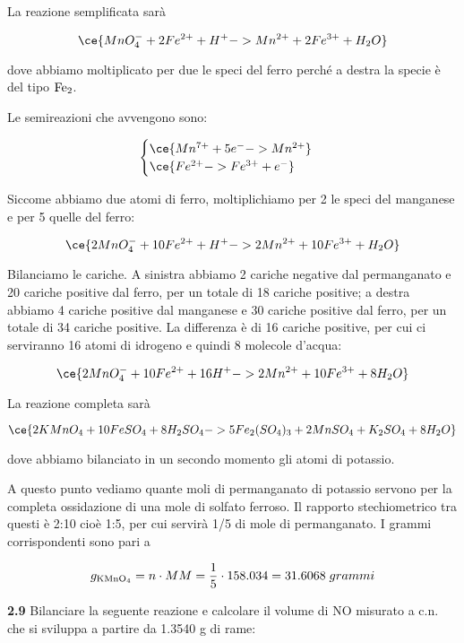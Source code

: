 La reazione semplificata sarà

$$\ce{MnO_4^- + 2Fe^{2+} + H^+ -> Mn^{2+} + 2Fe^{3+} + H_2O}$$

dove abbiamo moltiplicato per due le speci del ferro perché a destra la specie è del tipo $\rm Fe_2$.

Le semireazioni che avvengono sono:

$$\begin{cases}
    \ce{Mn^{7+} + 5e^- -> Mn^{2+}}\\
    \ce{Fe^{2+} -> Fe^{3+} + e^-}
\end{cases}$$

Siccome abbiamo due atomi di ferro, moltiplichiamo per 2 le speci del manganese e per 5 quelle del ferro:

$$\ce{2MnO_4^- + 10Fe^{2+} + H^+ -> 2Mn^{2+} + 10Fe^{3+} + H_2O}$$

Bilanciamo le cariche. A sinistra abbiamo 2 cariche negative dal permanganato e 20 cariche positive dal ferro, per un totale di 18 cariche positive; a destra abbiamo 4 cariche positive dal manganese e 30 cariche positive dal ferro, per un totale di 34 cariche positive. La differenza è di 16 cariche positive, per cui ci serviranno 16 atomi di idrogeno e quindi 8 molecole d'acqua:

$$\ce{2MnO_4^- + 10Fe^{2+} + 16H^+ -> 2Mn^{2+} + 10Fe^{3+} + 8H_2O}$$

La reazione completa sarà

$$\ce{2KMnO_4 + 10FeSO_4 + 8H_2SO_4 -> 5Fe_2(SO_4)_3 + 2MnSO_4 + K_2SO_4 + 8H_2O}$$

dove abbiamo bilanciato in un secondo momento gli atomi di potassio.

A questo punto vediamo quante moli di permanganato di potassio servono per la completa ossidazione di una mole di solfato ferroso. Il rapporto stechiometrico tra questi è 2:10 cioè 1:5, per cui servirà 1/5 di mole di permanganato. I grammi corrispondenti sono pari a

$$g_{\rm KMnO_4}=n \cdot MM=\frac{1}{5} \cdot 158.034
=31.6068\;grammi$$

\vspace{0.2cm}\textbf{2.9} Bilanciare la seguente reazione e calcolare il volume di NO misurato a c.n. che si sviluppa a
partire da 1.3540 g di rame:

\begin{center}
\end{center}

